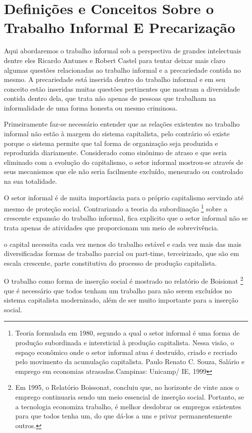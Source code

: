 \chapter{Definições e Conceitos Sobre o Trabalho Informal E Precarização}

Aqui abordaremos o trabalho informal sob a perspectiva de grandes intelectuais dentre eles Ricardo Antunes e Robert Castel para tentar deixar mais claro algumas questões relacionadas ao trabalho informal e a precariedade contida no mesmo. A precariedade está inserida dentro do trabalho informal e em seu conceito estão inseridas muitas questões pertinentes que mostram a diversidade contida dentro dela, que trata não apenas de pessoas que trabalham na informalidade de uma forma honesta ou mesmo criminosa.

Primeiramente faz-se necessário entender que as relações existentes no trabalho informal não estão à margem do sistema capitalista, pelo contrário só existe porque o sistema permite que tal forma de organização seja produzida e reproduzida diariamente. Considerado como sinônimo de atraso e que seria eliminado com a evolução do capitalismo, o setor informal mostrou-se através de seus mecanismos que ele não seria facilmente excluído, mensurado ou controlado na sua totalidade.

O setor informal é de muita importância para o próprio capitalismo servindo
até mesmo de proteção social. Contrariando a teoria da subordinação \footnote{
Teoria formulada em 1980, segundo a qual o setor informal é uma forma de
produção subordinada e intersticial à produção capitalista. Nessa visão, o
espaço econômico onde o setor informal atua é destruído, criado e recriado
pelo movimento da acumulação capitalista. Paulo Renato C. Souza, Salário e
emprego em economias atrasadas.Campinas: Unicamp/ IE, 1999} sobre a crescente
expansão do trabalho informal, fica explicito que o setor informal não se
trata apenas de atividades que proporcionam um meio de sobrevivência.

\begin{citacao}
o capital necessita cada vez menos do trabalho estável e cada vez mais das mais 
diversificadas formas de trabalho parcial ou part-time, terceirizado, que são em 
escala crescente, parte constitutiva do processo de produção capitalista. \cite{antunes2011modos}
\end{citacao}

O trabalho como forma de inserção social é mostrado no relatório de Boisionat
\footnote{Em 1995, o Relatório Boissonat, concluiu que, no horizonte de vinte
anos o emprego continuaria sendo um meio essencial de inserção social.
Portanto, se a tecnologia economiza trabalho, é melhor desdobrar os empregos
existentes para que todos tenha um, do que dá-los a uns e privar
permanentemente outros.} que é necessário que todos tenham um trabalho para
não serem excluídos no sistema capitalista modernizado, além de ser muito
importante para a inserção social.

